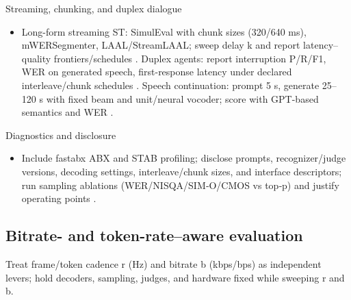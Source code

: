 Streaming, chunking, and duplex dialogue
\begin{itemize}
  \item Long-form streaming ST: SimulEval with chunk sizes (320/640 ms), mWERSegmenter, LAAL/StreamLAAL; sweep delay k and report latency–quality frontiers/schedules \cite{guo2025streamuniachievingstreamingspeechtransla,zhao2024textlessstreamingspeechtranslationsemant}. Duplex agents: report interruption P/R/F1, WER on generated speech, first-response latency under declared interleave/chunk schedules \cite{ma2024languagemodelcanlistenwhilespeaking,cui2025thinkbeforeyoutalkenhancingmeaningfuldia,hu2025salmduplexefficientdirectmodelingspeechl}. Speech continuation: prompt 5 s, generate 25–120 s with fixed beam and unit/neural vocoder; score with GPT-based semantics and WER \cite{nakata2024jchatjapaneselargescalespokendialoguecor,cui2025thinkbeforeyoutalkenhancingmeaningfuldia}.
\end{itemize}

Diagnostics and disclosure
\begin{itemize}
  \item Include fastabx ABX and STAB profiling; disclose prompts, recognizer/judge versions, decoding settings, interleave/chunk sizes, and interface descriptors; run sampling ablations (WER/NISQA/SIM‑O/CMOS vs top‑p) and justify operating points \cite{poli2025fastabxlibraryefficientcomputationabxdis,vashishth2024stabspeechtokenizerassessmentbenchmark,nguyen2025qwenvsgemmaintegrationwhispercomparative,li2024investigatingneuralaudiocodecsspeechlang}.
\end{itemize}

\subsection{Bitrate- and token-rate–aware evaluation} \label{subsec:Bitrate- and token-rate–aware evaluation}
Treat frame/token cadence r (Hz) and bitrate b (kbps/bps) as independent levers; hold decoders, sampling, judges, and hardware fixed while sweeping r and b.

